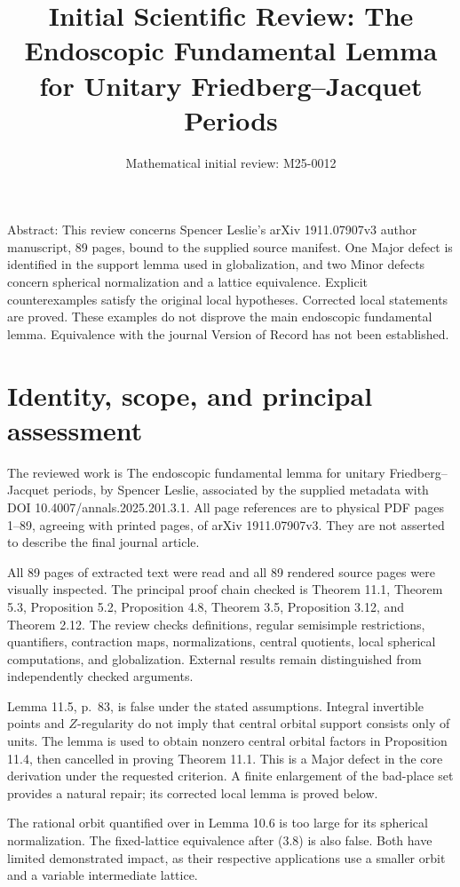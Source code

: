 \documentclass[10pt]{article}
\title{Initial Scientific Review:
The Endoscopic Fundamental Lemma
for Unitary Friedberg–Jacquet Periods}
\author{Mathematical initial review: M25-0012}
\date{}
\begin{document}
\maketitle
Abstract: This review concerns Spencer Leslie’s arXiv 1911.07907v3 author manuscript, 89 pages, bound to the supplied source manifest. One Major defect is identified in the support lemma used in globalization, and two Minor defects concern spherical normalization and a lattice equivalence. Explicit counterexamples satisfy the original local hypotheses. Corrected local statements are proved. These examples do not disprove the main endoscopic fundamental lemma. Equivalence with the journal Version of Record has not been established.\par
\section*{Identity, scope, and principal assessment}
The reviewed work is The endoscopic fundamental lemma for unitary Friedberg–Jacquet periods, by Spencer Leslie, associated by the supplied metadata with DOI 10.4007/annals.2025.201.3.1. All page references are to physical PDF pages 1–89, agreeing with printed pages, of arXiv 1911.07907v3. They are not asserted to describe the final journal article.\par
All 89 pages of extracted text were read and all 89 rendered source pages were visually inspected. The principal proof chain checked is Theorem 11.1, Theorem 5.3, Proposition 5.2, Proposition 4.8, Theorem 3.5, Proposition 3.12, and Theorem 2.12. The review checks definitions, regular semisimple restrictions, quantifiers, contraction maps, normalizations, central quotients, local spherical computations, and globalization. External results remain distinguished from independently checked arguments.\par
Lemma 11.5, p. 83, is false under the stated assumptions. Integral invertible points and \(Z\)-regularity do not imply that central orbital support consists only of units. The lemma is used to obtain nonzero central orbital factors in Proposition 11.4, then cancelled in proving Theorem 11.1. This is a Major defect in the core derivation under the requested criterion. A finite enlargement of the bad-place set provides a natural repair; its corrected local lemma is proved below.\par
The rational orbit quantified over in Lemma 10.6 is too large for its spherical normalization. The fixed-lattice equivalence after (3.8) is also false. Both have limited demonstrated impact, as their respective applications use a smaller orbit and a variable intermediate lattice.\par
\end{document}
